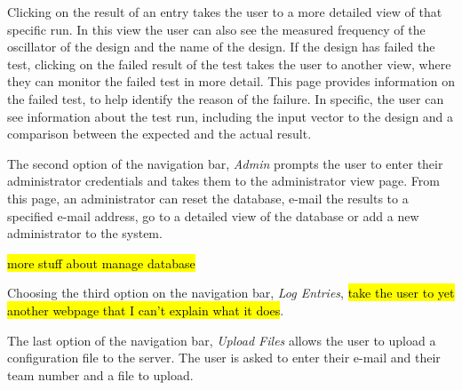 Clicking on the result of an entry takes the user to a more detailed view of that specific run. In this view the user can also see the measured frequency of the oscillator of the design and the name of the design. If the design has failed the test, clicking on the failed result of the test takes the user to another view, where they can monitor the failed test in more detail. This page provides information on the failed test, to help identify the reason of the failure. In specific, the user can see information about the test run, including the input vector to the design and a comparison between the expected and the actual result.

The second option of the navigation bar, \textit{Admin} prompts the user to enter their administrator credentials and takes them to the administrator view page. From this page, an administrator can reset the database, e-mail the results to a specified e-mail address, go to a detailed view of the database or add a new administrator to the system.

\hl{more stuff about manage database}

Choosing the third option on the navigation bar, \textit{Log Entries}, \hl{take the user to yet another webpage that I can't explain what it does}.

The last option of the navigation bar, \textit{Upload Files} allows the user to upload a configuration file to the server. The user is asked to enter their e-mail and their team number and a file to upload.